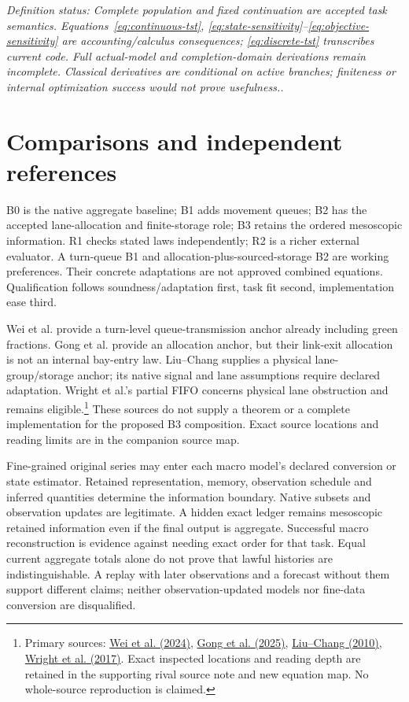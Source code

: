 \documentclass[11pt]{article}
\newcommand{\status}[1]{\textit{Definition status: #1.}}
\begin{document}
\status{Complete population and fixed continuation are accepted task semantics. Equations~\eqref{eq:continuous-tst}, \eqref{eq:state-sensitivity}--\eqref{eq:objective-sensitivity} are accounting/calculus consequences; \eqref{eq:discrete-tst} transcribes current code. Full actual-model and completion-domain derivations remain incomplete. Classical derivatives are conditional on active branches; finiteness or internal optimization success would not prove usefulness.}

\section{Comparisons and independent references}

B0 is the native aggregate baseline; B1 adds movement queues; B2 has the accepted lane-allocation and finite-storage role; B3 retains the ordered mesoscopic information. R1 checks stated laws independently; R2 is a richer external evaluator. A turn-queue B1 and allocation-plus-sourced-storage B2 are working preferences. Their concrete adaptations are not approved combined equations. Qualification follows soundness/adaptation first, task fit second, implementation ease third.

Wei et al. provide a turn-level queue-transmission anchor already including green fractions. Gong et al. provide an allocation anchor, but their link-exit allocation is not an internal bay-entry law. Liu--Chang supplies a physical lane-group/storage anchor; its native signal and lane assumptions require declared adaptation. Wright et al.'s partial FIFO concerns physical lane obstruction and remains eligible.\footnote{Primary sources: \href{https://doi.org/10.1016/j.trc.2024.104937}{Wei et al. (2024)}, \href{https://doi.org/10.1016/j.trb.2025.103208}{Gong et al. (2025)}, \href{https://doi.org/10.1016/j.trc.2010.04.005}{Liu--Chang (2010)}, \href{https://doi.org/10.1016/j.trb.2017.09.001}{Wright et al. (2017)}. Exact inspected locations and reading depth are retained in the supporting rival source note and new equation map. No whole-source reproduction is claimed.} These sources do not supply a theorem or a complete implementation for the proposed B3 composition. Exact source locations and reading limits are in the companion source map.

Fine-grained original series may enter each macro model's declared conversion or state estimator. Retained representation, memory, observation schedule and inferred quantities determine the information boundary. Native subsets and observation updates are legitimate. A hidden exact ledger remains mesoscopic retained information even if the final output is aggregate. Successful macro reconstruction is evidence against needing exact order for that task. Equal current aggregate totals alone do not prove that lawful histories are indistinguishable. A replay with later observations and a forecast without them support different claims; neither observation-updated models nor fine-data conversion are disqualified.
\end{document}
